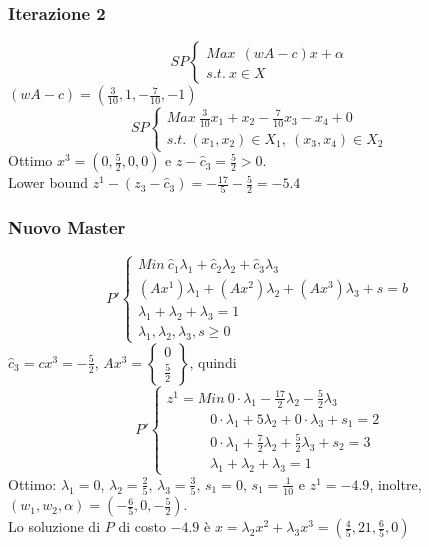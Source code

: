 \subsubsection{Iterazione 2}
\begin{equation*}
	SP
	\begin{cases}
		Max\ \ (w A-c)x+\alpha \\
		s.t. \ x\in X
	\end{cases}
\end{equation*}
$(w A-c)=(\frac{3}{10},1,-\frac{7}{10},-1)$
\begin{equation*}
	SP
	\begin{cases}
		Max\ \frac{3}{10}x_{1}+x_{2}-\frac{7}{10}x_{3}-x_{4}+0 \\
		s.t.\ (x_{1},x_{2})\in X_{1},\ (x_{3},x_{4})\in X_{2}
	\end{cases}
\end{equation*}
Ottimo $x^{3}=(0,\frac{5}{2},0,0)$ e $z-\hat{c}_{3}=\frac{5}{2}>0$.\\
Lower bound $z^{1}-(z_{3}-\hat{c}_{3})=-\frac{17}{5}-\frac{5}{2}=-5.4$

\subsubsection{Nuovo Master}
\begin{equation*}
	P'
	\begin{cases}
		Min\ \hat{c}_{1}\lambda_{1}+\hat{c}_{2}\lambda_{2}+\hat{c}_{3}\lambda_{3}\\
		(Ax^{1})\lambda_{1}+(Ax^{2})\lambda_{2}+(Ax^{3})\lambda_{3}+s=b \\
		\lambda_{1}+\lambda_{2}+\lambda_{3}=1 \\
		\lambda_{1},\lambda_{2},\lambda_{3},s\ge 0
	\end{cases}
\end{equation*}
$\hat{c}_{3}=cx^{3}=-\frac{5}{2}$, $Ax^{3}=\begin{Bmatrix}0\\\frac{5}{2}\end{Bmatrix}$, quindi
\begin{equation*}
	P'
	\begin{cases}
		z^{1}=Min\ 0\cdot\lambda_{1}-\frac{17}{2}\lambda_{2}-\frac{5}{2}\lambda_{3} \\
		\ \ \ \ \ \ \ \ \ \ \ \ \ \  0\cdot\lambda_{1}+5\lambda_{2}+0\cdot\lambda_{3}+s_{1}=2 \\
		\ \ \ \ \ \ \ \ \ \ \ \ \ \  0\cdot\lambda_{1}+\frac{7}{2}\lambda_{2}+\frac{5}{2}\lambda_{3}+s_{2}=3 \\
		\ \ \ \ \ \ \ \ \ \ \ \ \ \ \lambda_{1}+\lambda_{2}+\lambda_{3}=1
	\end{cases}
\end{equation*}
Ottimo: $\lambda_{1}=0$, $\lambda_{2}=\frac{2}{5}$, $\lambda_{3}=\frac{3}{5}$, $s_{1}=0$, $s_{1}=\frac{1}{10}$ e $z^{1}=-4.9$, inoltre, $(w_{1},w_{2},\alpha)=(-\frac{6}{5},0,-\frac{5}{2})$.\\
Lo soluzione di $P$ di costo $-4.9$ è $x=\lambda_{2}x^{2}+\lambda_{3}x^{3}=(\frac{4}{5},21,\frac{6}{5},0)$

